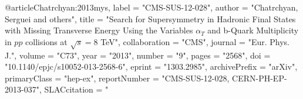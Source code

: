 @article{Chatrchyan:2013mys,
      label          = "CMS-SUS-12-028",
      author         = "Chatrchyan, Serguei and others",
      title          = "{Search for Supersymmetry in Hadronic Final States with
                        Missing Transverse Energy Using the Variables $\alpha_T$
                        and b-Quark Multiplicity in $pp$ collisions at $\sqrt{s}=
                        8$ TeV}",
      collaboration  = "CMS",
      journal        = "Eur. Phys. J.",
      volume         = "C73",
      year           = "2013",
      number         = "9",
      pages          = "2568",
      doi            = "10.1140/epjc/s10052-013-2568-6",
      eprint         = "1303.2985",
      archivePrefix  = "arXiv",
      primaryClass   = "hep-ex",
      reportNumber   = "CMS-SUS-12-028, CERN-PH-EP-2013-037",
      SLACcitation   = "%
}

